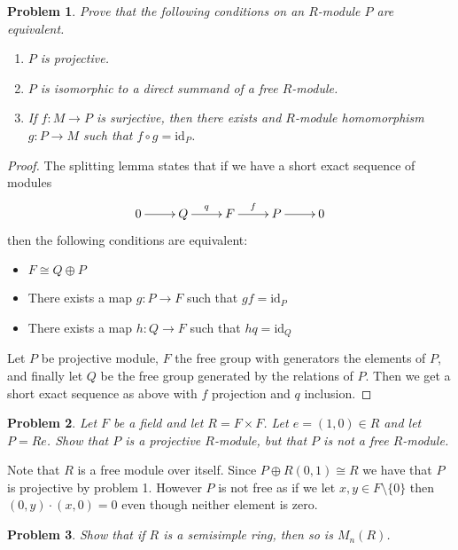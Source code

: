 \documentclass[10pt]{article}
\newcommand{\sk}{\vskip 10mm}
\newcommand{\id}{\mathrm{id}}
\theoremstyle{plain}
\newtheorem{problem}{Problem}
\theoremstyle{remark}
\begin{document}
\begin{problem}
  Prove that the following conditions on an $R$-module $P$ are equivalent.
  \begin{enumerate}
  \item[(a)] $P$ is projective.
  \item[(b)] $P$ is isomorphic to a direct summand of a free $R$-module.
  \item[(c)] If $f:M\rightarrow P$ is surjective, then there exists and
    $R$-module homomorphism $g:P\rightarrow M$ such that $f\circ g=\id_P$.
  \end{enumerate}
\end{problem}

\begin{proof}
  The splitting lemma states that if we have a short exact sequence
  of modules
  \[
    \xymatrix{
      0 \ar[r] & Q \ar[r]^q & F \ar[r]^f & P \ar[r] & 0
    }
  \]
  then the following conditions are equivalent:
  \begin{itemize}
  \item $F\cong Q\oplus P$
  \item There exists a map $g:P\rightarrow F$ such that $gf=\id_P$
  \item There exists a map $h:Q\rightarrow F$ such that $hq=\id_Q$
  \end{itemize}

  Let $P$ be projective module, $F$ the free group with
  generators the elements of $P$, and finally let $Q$
  be the free group generated by the relations of $P$.
  Then we get a short exact sequence as above with
  $f$ projection and $q$ inclusion.
\end{proof}

\sk

\begin{problem}
  Let $F$ be a field and let $R=F\times F$. Let $e=(1,0)\in R$ and let  $P=Re$.
  Show that $P$ is a projective $R$-module, but that $P$ is not a
  free $R$-module.
\end{problem}

Note that $R$ is a free module over itself. Since $P\oplus R(0,1)\cong R$
we have that $P$ is projective by problem 1. However $P$ is
not free as if we let $x,y\in F\setminus\{0\}$ then $(0,y)\cdot(x,0)=0$ even
though neither element is zero.

\sk

\begin{problem}
  Show that if $R$ is a semisimple ring, then so is $M_n(R)$.
\end{problem}
\end{document}
